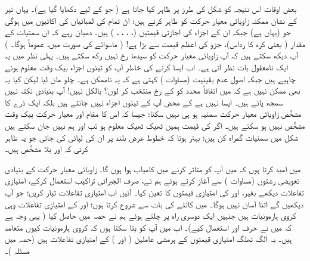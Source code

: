  بعض اوقات اس نتیجہ کو شکل  کی طرز پر ظاہر کیا جاتا ہے ( جو  کے لیے دکھایا گیا ہے)۔ یہاں تیر کے نشان ممکنہ زاویائی معیار حرکت کو ظاہر کرتے ہیں؛ ان تمام کی لمبائیاں  کی اکائیوں میں  ہوگی جو (یہاں  ہے) جبکہ ان کے  اجزاء  کی اجازتی قیمتیں (، ، ، ، ) ہیں۔ دھیان رہے کہ ان سمتیات کے مقدار ( یعنی کرہ کا رداس)،  جزو کی اعظم قیمت سے بڑا ہے! ( ماسوائے  کی صورت میں، عموماً  ہوگا۔ ) آپ دیکھ سکتے ہیں کہ آپ زاویائی معیار حرکت کو سیدھا  رخ نہیں رکھ سکتے ہیں۔ پہلی نظر میں یہ ایک نامعقول بات نظر آتی ہے۔ اب ایسا کرنے کی خاطر آپ کو تینوں اجزاء بیک وقت معلوم ہونے چاہیے ہیں جبکہ اصول عدم یقینیت (مساوات ) کہتی ہے کہ یہ ناممکن ہے۔ چلو مان لیا لیکن کیا یہ بھی ممکن نہیں ہے کہ میں اتفاقاً  محدد کو  کے رخ منتخب کر لوں؟ بالکل نہیں! آپ بنیادی نکتہ نہیں سمجھ پائے ہیں۔ ایسا نہیں ہے کے محض آپ  کے تینوں اجزاء نہیں جانتے ہیں بلکہ ایک ذرے کا مشخَّص زاویائی معیار حرکت سمتیہ ہو ہی نہیں سکتا؛ جیسا کہ اس کا مقام اور معیار حرکت بیک وقت مشخَّص نہیں ہو سکتے ہیں۔ اگر  کی قیمت ہمیں ٹھیک ٹھیک معلوم ہو تب  اور  ہم نہیں جان سکتے ہیں شکل  میں سمتیات گمراہ کن ہیں؛ بہتر ہوتا کہ خطوط عرض بلند پر ان کی لپائی کی جاتی جو یہ ظاہر کرتی کہ  اور  بلا مشخَّص ہیں۔

 میں امید کرتا ہوں کہ میں آپ کو متاثر کرنے میں کامیاب ہوا ہوں گا۔ زاویائی معیار حرکت کے بنیادی تعویضی  رشتوں (مساوات ) سے آغاز کرتے ہوئے ہم نے، صرف الجبرائی تراکیب استعمال کرکے، امتیازی تفاعلات دیکھے بغیر،  اور  کی  امتیازی قیمتوں  کا  تعین کیا۔ آئیں اب امتیازی تفاعلات تیار کریں؛ جو آپ دیکھیں گے اتنا آسان نہیں ہوگا۔ میں کانٹے کی بات  سے شروع کرتا ہوں؛  اور  کے امتیازی تفاعلات وہی کروی ہارمونیات ہیں جنہیں ایک دوسری راہ پر چلتے ہوئے ہم نے حصہ  میں حاصل کیا ( یہی وجہ ہے کہ میں نے حرف  اور  استعمال کیے)۔ اب میں آپ کو بتا سکتا ہوں کہ کروی ہارمونیات کیوں متعامد ہیں۔ یہ الگ تھلگ امتیازی قیمتوں  کے ہرمشی عاملین (  اور ) کے امتیازی تفاعلات ہیں (حصہ  میں مسئلہ )۔ 

